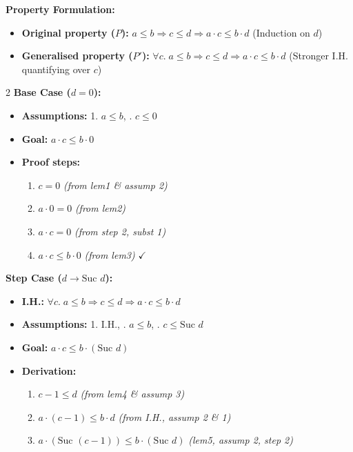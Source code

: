 \documentclass[10pt,a4paper]{article}
\begin{document}
\begin{tcolorbox}[title={2. Worked Example: Proving $a \le b \Longrightarrow c \le d \Longrightarrow a \cdot c \le b \cdot d$}]
\textbf{Property Formulation:}
\begin{itemize}[leftmargin=1.2em, itemsep=2pt]
    \item \textbf{Original property ($P$):} $a \le b \Longrightarrow c \le d \Longrightarrow a \cdot c \le b \cdot d$ \quad (Induction on $d$)
    \item \textbf{Generalised property ($P'$):} $\forall c.\; a \le b \Longrightarrow c \le d \Longrightarrow a \cdot c \le b \cdot d$ \quad (Stronger I.H. quantifying over $c$)
\end{itemize}

\vspace{0.3em}
\begin{multicols}{2}
\textbf{Base Case ($d = 0$):}
\begin{itemize}[leftmargin=1.2em, itemsep=2pt]
    \item \textbf{Assumptions:} 1. $a \le b$, . $c \le 0$
    \item \textbf{Goal:} $a \cdot c \le b \cdot 0$
    \item \textbf{Proof steps:}
    \begin{enumerate}[leftmargin=1.2em, itemsep=1pt]
        \item $c = 0$ \quad \textit{(from lem1 \& assump 2)}
        \item $a \cdot 0 = 0$ \quad \textit{(from lem2)}
        \item $a \cdot c = 0$ \quad \textit{(from step 2, subst 1)}
        \item $a \cdot c \le b \cdot 0$ \quad \textit{(from lem3)} $\checkmark$
    \end{enumerate}
\end{itemize}

\columnbreak

\textbf{Step Case ($d \to \text{Suc } d$):}
\begin{itemize}[leftmargin=1.2em, itemsep=2pt]
    \item \textbf{I.H.:} $\forall c.\; a \le b \Longrightarrow c \le d \Longrightarrow a \cdot c \le b \cdot d$
    \item \textbf{Assumptions:} 1. I.H., . $a \le b$, . $c \le \text{Suc } d$
    \item \textbf{Goal:} $a \cdot c \le b \cdot (\text{Suc } d)$
    \item \textbf{Derivation:}
    \begin{enumerate}[leftmargin=1.2em, itemsep=1pt]
        \item $c - 1 \le d$ \quad \textit{(from lem4 \& assump 3)}
        \item $a \cdot (c - 1) \le b \cdot d$ \quad \textit{(from I.H., assump 2 \& 1)}
        \item $a \cdot (\text{Suc }(c - 1)) \le b \cdot (\text{Suc } d)$ \quad \textit{(lem5, assump 2, step 2)}
    \end{enumerate}
\end{itemize}
\end{multicols}


\end{tcolorbox}
\end{document}
